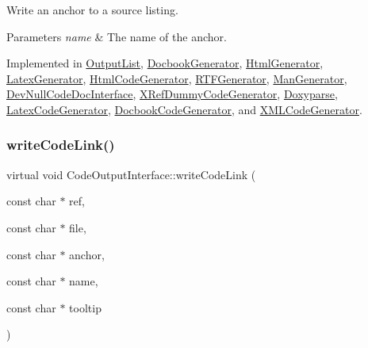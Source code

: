 Write an anchor to a source listing. 
\begin{DoxyParams}{Parameters}
{\em name} & The name of the anchor. \\
\hline
\end{DoxyParams}


Implemented in \mbox{\hyperlink{class_output_list_ad40cf8ca8c6289590afa5871b8d5d9a0}{Output\+List}}, \mbox{\hyperlink{class_docbook_generator_a7fc22eda4420a580d40a7fa2624209b6}{Docbook\+Generator}}, \mbox{\hyperlink{class_html_generator_a9e2528347c04b6f07dd9263441dbcf4f}{Html\+Generator}}, \mbox{\hyperlink{class_latex_generator_af9dc92f8c155f2bb2f5d969ea5ef7cff}{Latex\+Generator}}, \mbox{\hyperlink{class_html_code_generator_a89ec8d4b9eb2b5162b4d9a7cab209b4a}{Html\+Code\+Generator}}, \mbox{\hyperlink{class_r_t_f_generator_a01b1cb771ecbdb9da62b21c980d1a5ae}{R\+T\+F\+Generator}}, \mbox{\hyperlink{class_man_generator_a15b2642afa851662afe60fb00d4b20fb}{Man\+Generator}}, \mbox{\hyperlink{class_dev_null_code_doc_interface_abfa6f09f69831c231f0fe7bb095b8fc4}{Dev\+Null\+Code\+Doc\+Interface}}, \mbox{\hyperlink{class_x_ref_dummy_code_generator_aae68bc8b3e507f39d5613d2840c5f10b}{X\+Ref\+Dummy\+Code\+Generator}}, \mbox{\hyperlink{class_doxyparse_a43aa79498085a47fcd0c122898133b20}{Doxyparse}}, \mbox{\hyperlink{class_latex_code_generator_a272d84903dad24a0f8bae1c8d4c8e239}{Latex\+Code\+Generator}}, \mbox{\hyperlink{class_docbook_code_generator_ac0f7f4cd4fec98da2855978adf786a04}{Docbook\+Code\+Generator}}, and \mbox{\hyperlink{class_x_m_l_code_generator_a2c6ae0bc633493d36a2b517c44ebb8f4}{X\+M\+L\+Code\+Generator}}.

\mbox{\label{class_code_output_interface_a102e2b7f40916c75b79871307f5bb674}} 
\subsubsection{\texorpdfstring{writeCodeLink()}{writeCodeLink()}}
{\footnotesize\ttfamily virtual void Code\+Output\+Interface\+::write\+Code\+Link (\begin{DoxyParamCaption}\item[{const char $\ast$}]{ref,  }\item[{const char $\ast$}]{file,  }\item[{const char $\ast$}]{anchor,  }\item[{const char $\ast$}]{name,  }\item[{const char $\ast$}]{tooltip }\end{DoxyParamCaption})\hspace{0.3cm}{\ttfamily [pure virtual]}}

